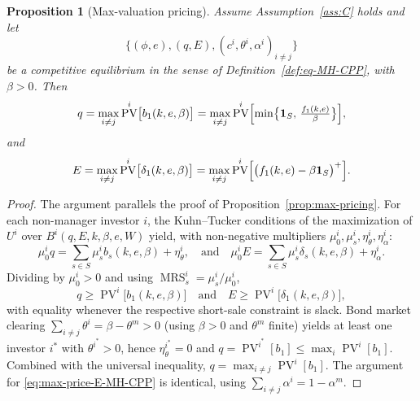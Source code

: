 \documentclass[11pt,a4paper,oneside]{book}
\def\1{\mathbf{1}}
\def\leq{\leqslant}
\def\geq{\geqslant}
\def\et{\quad \text{and} \quad}
\DeclareMathOperator{\MRS}{MRS}
\DeclareMathOperator{\PV}{PV}
\theoremstyle{plain}
\newtheorem{proposition}[theorem]{Proposition}
\theoremstyle{definition}
\theoremstyle{remark}
\numberwithin{equation}{chapter}
\begin{document}
\begin{proposition}[Max-valuation pricing]\label{prop:max-pricing-MH-CPP}
Assume Assumption~\ref{ass:C} holds and let
\begin{equation*}
  \bigl\{ (\phi, e), (q, E), (c^i, \theta^i, \alpha^i)_{i \neq j} \bigr\}
\end{equation*}
be a competitive equilibrium in the sense of Definition~\ref{def:eq-MH-CPP}, with $\beta > 0$.
Then
\begin{equation}\label{eq:max-price-q-MH-CPP}
  q = \max_{i \neq j} \PV^i\bigl[ b_1(k, e, \beta) \bigr]
  = \max_{i \neq j} \PV^i\Bigl[ \min\bigl\{ \1_S, \, \tfrac{f_1(k, e)}{\beta} \bigr\} \Bigr],
\end{equation}
and
\begin{equation}\label{eq:max-price-E-MH-CPP}
  E = \max_{i \neq j} \PV^i\bigl[ \delta_1(k, e, \beta) \bigr]
  = \max_{i \neq j} \PV^i\Bigl[ \bigl( f_1(k, e) - \beta \1_S \bigr)^+ \Bigr].
\end{equation}
\end{proposition}

\begin{proof}
The argument parallels the proof of Proposition~\ref{prop:max-pricing}.
For each non-manager investor $i$, the Kuhn--Tucker conditions of the maximization of $U^i$ over $B^i(q, E, k, \beta, e, W)$ yield, with non-negative multipliers $\mu^i_0, \mu^i_s, \eta^i_\theta, \eta^i_\alpha$:
\begin{equation*}
  \mu^i_0 q = \sum_{s \in S} \mu^i_s b_s(k, e, \beta) + \eta^i_\theta,
  \et
  \mu^i_0 E = \sum_{s \in S} \mu^i_s \delta_s(k, e, \beta) + \eta^i_\alpha.
\end{equation*}
Dividing by $\mu^i_0 > 0$ and using $\MRS^i_s = \mu^i_s / \mu^i_0$,
\begin{equation*}
  q \geq \PV^i\bigl[ b_1(k, e, \beta) \bigr]
  \et
  E \geq \PV^i\bigl[ \delta_1(k, e, \beta) \bigr],
\end{equation*}
with equality whenever the respective short-sale constraint is slack.
Bond market clearing $\sum_{i \neq j} \theta^i = \beta - \theta^m > 0$ (using $\beta > 0$ and $\theta^m$ finite) yields at least one investor $i^\ast$ with $\theta^{i^\ast} > 0$, hence $\eta^{i^\ast}_\theta = 0$ and $q = \PV^{i^\ast}[b_1] \leq \max_i \PV^i[b_1]$.
Combined with the universal inequality, $q = \max_{i \neq j} \PV^i[b_1]$.
The argument for \eqref{eq:max-price-E-MH-CPP} is identical, using $\sum_{i \neq j} \alpha^i = 1 - \alpha^m$.
\end{proof}
\end{document}
